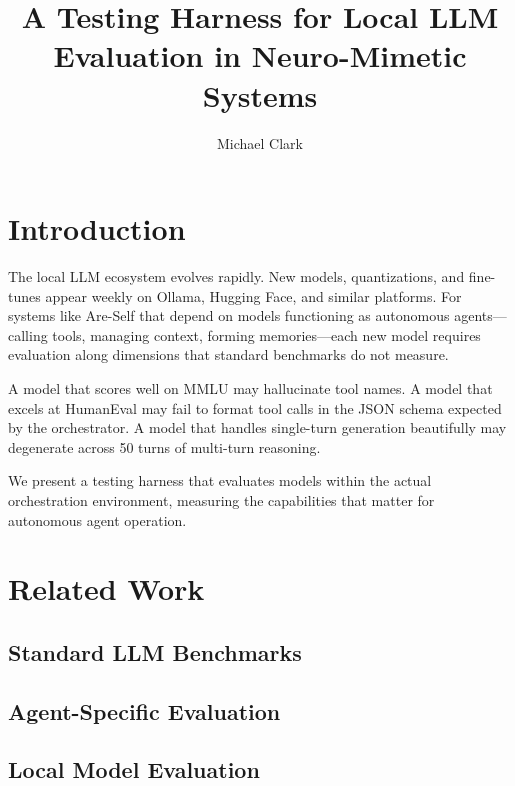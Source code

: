 \documentclass[man,12pt,floatsintext]{apa7}
\title{A Testing Harness for Local LLM Evaluation in Neuro-Mimetic Systems}
\author{Michael Clark}
\affiliation{Independent Researcher \\ scipraxian}
\begin{document}
\maketitle

\section{Introduction}

The local LLM ecosystem evolves rapidly. New models, quantizations, and fine-tunes appear
weekly on Ollama, Hugging Face, and similar platforms. For systems like Are-Self that
depend on models functioning as autonomous agents---calling tools, managing context,
forming memories---each new model requires evaluation along dimensions that standard
benchmarks do not measure.

A model that scores well on MMLU may hallucinate tool names. A model that excels at
HumanEval may fail to format tool calls in the JSON schema expected by the orchestrator.
A model that handles single-turn generation beautifully may degenerate across 50 turns
of multi-turn reasoning.

We present a testing harness that evaluates models within the actual orchestration
environment, measuring the capabilities that matter for autonomous agent operation.

\section{Related Work}

\subsection{Standard LLM Benchmarks}


\subsection{Agent-Specific Evaluation}


\subsection{Local Model Evaluation}
\end{document}
